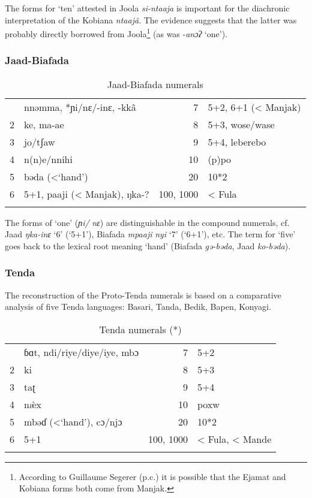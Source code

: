 {The forms for ‘ten’ attested in Joola} {\textit{si-ntaaja}}{ is important for the diachronic interpretation of the Kobiana} {\textit{ntaaj{\~{a}}}}{. The evidence suggests that the latter was probably directly borrowed from Joola}\footnote{According to Guillaume Segerer (p.c.) it is possible that the Ejamat and Kobiana forms both come from Manjak.} { (as was} -\textit{anɔʔ} ‘one’{).}

\subsubsection{Jaad-Biafada}%
\begin{table}
\caption{\label{tab:3:224}Jaad-Biafada numerals}
\begin{tabularx}{\textwidth}{lQrl}
 & nnəmma, *ɲi/nɛ/-inɛ, -kk{\~{a}} & 7 & 5+2, 6+1 (< Manjak)\\
2 & ke, ma-ae & 8 & 5+3, wose/wase\\
3 & jo/tʃaw & 9 & 5+4, leberebo\\
4 & n(n)e/nnihi & 10 & (p)po\\
5 & bəda (<‘hand') & 20 & 10*2\\
6 & 5+1, paaji (< Manjak), ŋka-? & 100, 1000 & < Fula\\
\lspbottomrule
\end{tabularx}
\end{table}

The forms of ‘one’ (\textit{ɲi/} \textit{nɛ}) are distinguishable in the compound numerals, cf. Jaad \textit{ŋka-inɛ} ‘6’ (‘5+1’), Biafada \textit{mpaaji} \textit{nyi} ‘7’ (‘6+1’), etc. The term for ‘five’ goes back to the lexical root meaning ‘hand’ (Biafada \textit{gə-bəda}, Jaad \textit{ko-bəda}).

\subsubsection{Tenda}%
The reconstruction of the Proto-Tenda numerals \citep{Pozdniakovmstenda} is based on a comparative analysis of five Tenda languages: Basari, Tanda, Bedik, Bapen, Konyagi.

\begin{table}
\caption{\label{tab:3:225}Tenda numerals (*)}
\begin{tabularx}{\textwidth}{lQrl}
 & {ɓɑt, ndi/riye/diye/iye, mbɔ} & 7 & 5+2\\
2 & ki & 8 & 5+3\\
3 & taʈ & 9 & 5+4\\
4 & {n{\`{æ}}x} & 10 & poxw\\
5 & mbəɗ (<`hand'), cɔ/njɔ & 20 & 10*2\\
6 & 5+1 & 100, 1000 & < Fula, < Mande\\
\lspbottomrule
\end{tabularx}
\end{table}


